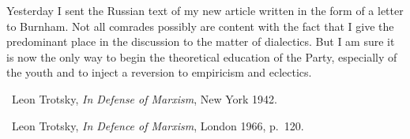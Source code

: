 

Yesterday I sent the Russian text of my new article written in the form of a letter to Burnham. Not all comrades possibly are content with the fact that I give the predominant place in the discussion to the matter of dialectics. But I am sure it is now the only way to begin the theoretical education of the Party, especially of the youth and to inject a reversion to empiricism and eclectics.


\begin{letterinfo}
	\firstpublished\ Leon Trotsky, \emph{In Defense of Marxism}, New York 1942.
	
	\checkedagainst\ Leon Trotsky, \emph{In Defence of Marxism}, London 1966, p.~120.
	
	\footnoteslatter
\end{letterinfo}
